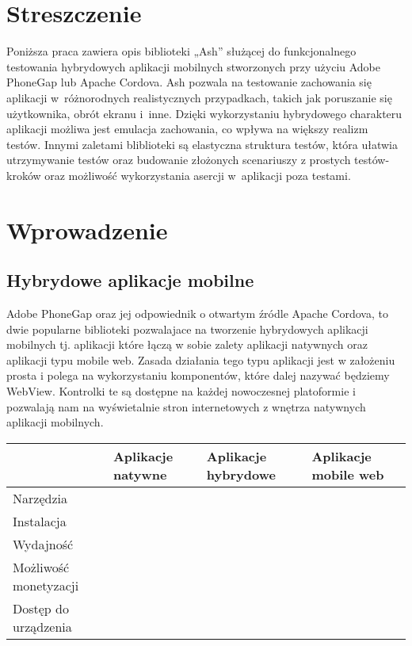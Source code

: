 \documentclass[a4paper]{article}
\begin{document}
\section{Streszczenie}
Poniższa praca zawiera opis biblioteki „Ash” służącej do funkcjonalnego testowania
hybrydowych aplikacji mobilnych stworzonych przy użyciu Adobe PhoneGap lub
Apache Cordova. Ash pozwala na testowanie zachowania się aplikacji w~różnorodnych
realistycznych przypadkach, takich jak poruszanie się użytkownika,
obrót ekranu i~inne. Dzięki wykorzystaniu hybrydowego charakteru aplikacji
możliwa jest emulacja zachowania, co wpływa na większy realizm testów. Innymi
zaletami bliblioteki są elastyczna struktura testów, która ułatwia utrzymywanie
testów oraz budowanie złożonych scenariuszy z prostych testów-kroków oraz
możliwość wykorzystania asercji w~aplikacji poza testami.

\section{Wprowadzenie}
\subsection{Hybrydowe aplikacje mobilne}
Adobe PhoneGap oraz jej odpowiednik o otwartym źródle Apache Cordova, to
dwie popularne biblioteki pozwalajace na tworzenie hybrydowych aplikacji
mobilnych tj. aplikacji które łączą w sobie zalety aplikacji natywnych oraz aplikacji
typu mobile web. Zasada działania tego typu aplikacji jest w założeniu prosta i
polega na wykorzystaniu komponentów, które dalej nazywać będziemy WebView.
Kontrolki te są dostępne na każdej nowoczesnej platoformie i pozwalają nam na
wyświetalnie stron internetowych z wnętrza natywnych aplikacji mobilnych.

\begin{center}
    \begin{tabular}{ | l | l | l | p{5cm} |}
    \hline
   				& Aplikacje natywne & Aplikacje hybrydowe 	& Aplikacje mobile web 	\\ \hline
    Narzędzia	& 					&						& 						\\ \hline
    Instalacja	& 					&						& 						\\ \hline
    Wydajność	& 					&						& 						\\ \hline
    Możliwość monetyzacji
    			& 					&						& 						\\ \hline
    Dostęp do urządzenia
    			& 					&						& 						\\ \hline
    \end{tabular}
\end{center}
\end{document}
